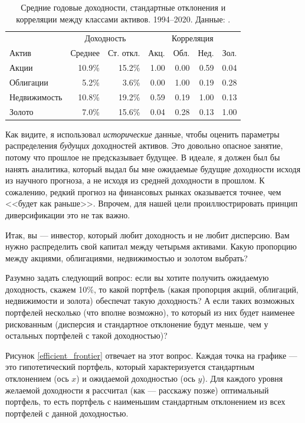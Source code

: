 \begin{table}[ht]
\centering
\begin{tabular}{l|r|r|r|r|r|r}
 & \multicolumn{2}{c|}{Доходность} & \multicolumn{4}{c}{Корреляция} \\ 
\cline{2-7}
Актив        & Среднее & Ст. откл. & Акц. & Обл. & Нед. & Зол. \\ \hline
Акции        & 10.9\%  & 15.2\%    & 1.00  & 0.00   & 0.59    & 0.04 \\
Облигации    & 5.2\%   & 3.6\%     & 0.00  & 1.00   & 0.19    & 0.28 \\
Недвижимость & 10.8\%  & 19.2\%    & 0.59  & 0.19   & 1.00    & 0.13 \\
Золото       & 7.0\%   & 15.6\%    & 0.04  & 0.28   & 0.13    & 1.00
\end{tabular}
\caption{Средние годовые доходности, стандартные отклонения и корреляции между 
классами активов. 1994--2020. Данные: \cite{portfolio2020}.}
\label{asset_class_returns_table}
\end{table}

Как видите, я использовал \emph{исторические} данные, чтобы оценить параметры 
распределения \emph{будущих} доходностей активов. Это довольно опасное занятие, 
потому что прошлое не предсказывает будущее. В идеале, я должен был бы нанять 
аналитика, который выдал бы мне ожидаемые будущие доходности исходя из научного 
прогноза, а не исходя из средней доходности в прошлом. К сожалению, редкий 
прогноз на финансовых рынках оказывается точнее, чем <<будет как раньше>>. 
Впрочем, для нашей цели проиллюстрировать принцип диверсификации это не так 
важно.

Итак, вы --- инвестор, который любит доходность и не любит дисперсию. Вам нужно 
распределить свой капитал между четырьмя активами. Какую пропорцию между 
акциями, облигациями, недвижимостью и золотом выбрать?

Разумно задать следующий вопрос: если вы хотите получить ожидаемую доходность, 
скажем 10\%, то какой портфель (какая пропорция акций, облигаций, недвижимости и 
золота) обеспечат такую доходность? А если таких возможных портфелей несколько 
(что вполне возможно), то который из них будет наименее рискованным (дисперсия и 
стандартное отклонение будут меньше, чем у остальных портфелей с такой 
доходностью)?

Рисунок \ref{efficient_frontier} отвечает на этот вопрос. Каждая точка на 
графике --- это гипотетический портфель, который характеризуется стандартным 
отклонением (ось $x$) и ожидаемой доходностью (ось $y$). Для каждого уровня 
желаемой доходности я рассчитал (как --- расскажу позже) оптимальный портфель, 
то есть портфель с наименьшим стандартным отклонением из всех портфелей с данной 
доходностью.

